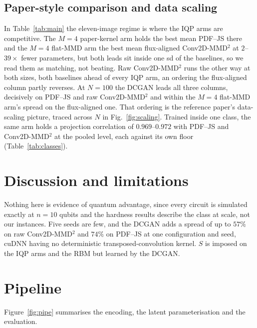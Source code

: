 \documentclass{article}
\begin{document}
\subsection{Paper-style comparison and data scaling}
\label{sec:table}

In Table~\ref{tab:main} the eleven-image regime is where the IQP arms are competitive. The $M{=}4$
paper-kernel arm holds the best mean PDF--JS there and the $M{=}4$ flat-MMD arm the best mean
flux-aligned Conv2D-MMD$^2$ at $2$--$39\times$ fewer parameters, but both leads sit inside one sd of
the baselines, so we read them as matching, not beating. Raw Conv2D-MMD$^2$ runs the other way
at both sizes, both baselines ahead of every IQP arm, an ordering the flux-aligned column partly
reverses. At $N{=}100$ the DCGAN leads all three columns, decisively on PDF--JS and raw
Conv2D-MMD$^2$ and within the $M{=}4$ flat-MMD arm's spread on the flux-aligned one.
That ordering is the reference paper's data-scaling picture, traced across $N$ in
Fig.~\ref{fig:scaling}. Trained inside one class, the same arm holds a projection correlation of
$0.969$--$0.972$ with PDF--JS and Conv2D-MMD$^2$ at the pooled level, each against its own floor
(Table~\ref{tab:classes}).

\section{Discussion and limitations}
\label{sec:disc}

Nothing here is evidence of quantum advantage, since every circuit is simulated exactly at $n=10$
qubits and the hardness results describe the class at scale, not our instances. Five seeds are
few, and the DCGAN adds a spread of up to $57\%$ on raw Conv2D-MMD$^2$ and $74\%$ on PDF--JS at one
configuration and seed, cuDNN having no deterministic transposed-convolution kernel. $S$ is imposed
on the IQP arms and the RBM but learned by the DCGAN.




\newpage
\appendix

\section{Pipeline}
\label{app:pipe}

Figure~\ref{fig:pipe} summarises the encoding, the latent parameterisation and the evaluation.
\end{document}
